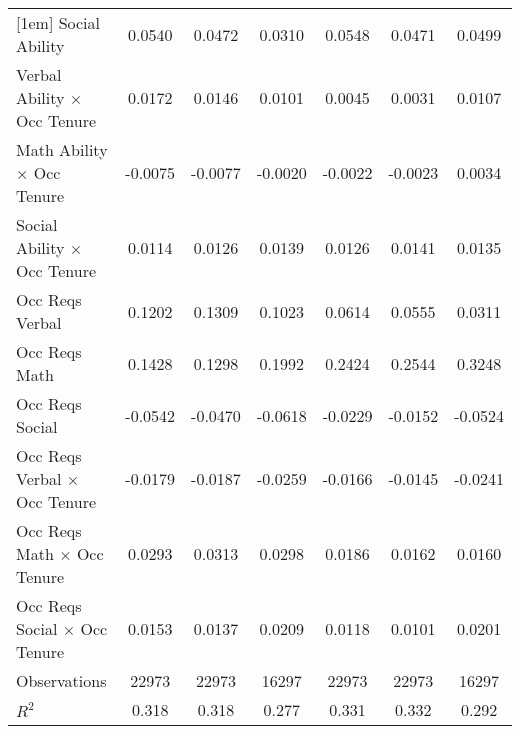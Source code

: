{\begin{tabular}{l*{6}{c}}
[1em]
Social Ability      &      0.0540\sym{**} &      0.0472\sym{**} &      0.0310         &      0.0548\sym{***}&      0.0471\sym{**} &      0.0499\sym{*}  \\
[1em]
Verbal Ability $\times$ Occ Tenure&      0.0172\sym{***}&      0.0146\sym{***}&      0.0101         &      0.0045         &      0.0031         &      0.0107\sym{**} \\
[1em]
Math Ability $\times$ Occ Tenure&     -0.0075         &     -0.0077         &     -0.0020         &     -0.0022         &     -0.0023         &      0.0034         \\
[1em]
Social Ability $\times$ Occ Tenure&      0.0114\sym{***}&      0.0126\sym{***}&      0.0139\sym{***}&      0.0126\sym{***}&      0.0141\sym{***}&      0.0135\sym{***}\\
[1em]
Occ Reqs Verbal     &      0.1202         &      0.1309         &      0.1023         &      0.0614         &      0.0555         &      0.0311         \\
[1em]
Occ Reqs Math       &      0.1428         &      0.1298         &      0.1992\sym{*}  &      0.2424\sym{***}&      0.2544\sym{***}&      0.3248\sym{***}\\
[1em]
Occ Reqs Social     &     -0.0542\sym{*}  &     -0.0470         &     -0.0618\sym{*}  &     -0.0229         &     -0.0152         &     -0.0524         \\
[1em]
Occ Reqs Verbal $\times$ Occ Tenure&     -0.0179         &     -0.0187         &     -0.0259         &     -0.0166\sym{*}  &     -0.0145         &     -0.0241\sym{*}  \\
[1em]
Occ Reqs Math $\times$ Occ Tenure&      0.0293\sym{***}&      0.0313\sym{***}&      0.0298\sym{**} &      0.0186\sym{**} &      0.0162\sym{*}  &      0.0160         \\
[1em]
Occ Reqs Social $\times$ Occ Tenure&      0.0153\sym{***}&      0.0137\sym{***}&      0.0209\sym{***}&      0.0118\sym{***}&      0.0101\sym{***}&      0.0201\sym{***}\\
\hline  
Observations        &       22973         &       22973         &       16297         &       22973         &       22973         &       16297         \\
\(R^{2}\)           &       0.318         &       0.318         &       0.277         &       0.331         &       0.332         &       0.292         \\
\hline  
\end{tabular}
}
